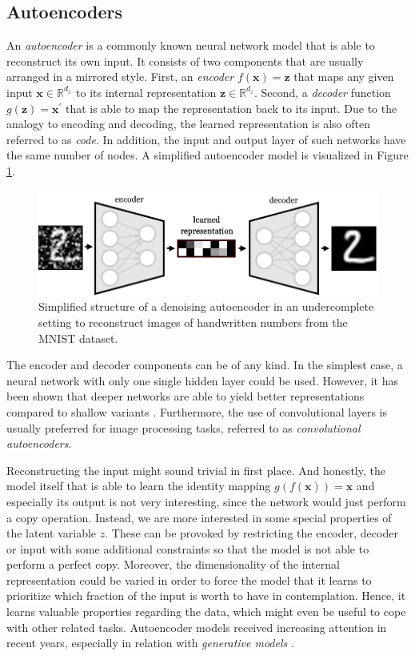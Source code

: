 \subsection{Autoencoders} \label{sec:autoencoder}

An \textit{autoencoder} is a commonly known neural network model that is able to reconstruct its own input. It consists of two components that are usually arranged in a mirrored style. First, an \textit{encoder} $ f(\textbf{x}) = \textbf{z} $ that maps any given input $ \textbf{x} \in \mathbb{R}^{d_x} $ to its internal representation $ \textbf{z} \in \mathbb{R}^{d_z} $. Second, a \textit{decoder} function $ g(\textbf{z}) = \textbf{x}^\prime $ that is able to map the representation back to its input. Due to the analogy to encoding and decoding, the learned representation is also often referred to as \textit{code}. In addition, the input and output layer of such networks have the same number of nodes. A simplified autoencoder model is visualized in Figure \ref{fig:autoencoder}. 

\begin{figure}[htpb]
	\centering
	\includegraphics[width=.8\linewidth]{figures/encoder_decoder.pdf}
	\caption[Structure of an Autoencoder]{Simplified structure of a denoising autoencoder in an undercomplete setting to reconstruct images of handwritten numbers from the MNIST dataset.} \label{fig:autoencoder}
\end{figure}

The encoder and decoder components can be of any kind. In the simplest case, a neural network with only one single hidden layer could be used. However, it has been shown that deeper networks are able to yield better representations compared to shallow variants \parencite{autoenc_deeper}. Furthermore, the use of convolutional layers is usually preferred for image processing tasks, referred to as \textit{convolutional autoencoders}.

Reconstructing the input might sound trivial in first place. And honestly, the model itself that is able to learn the identity mapping $ g(f(\textbf{x})) = \textbf{x} $ and especially its output is not very interesting, since the network would just perform a copy operation. Instead, we are more interested in some special properties of the latent variable $ z $. These can be provoked by restricting the encoder, decoder or input with some additional constraints so that the model is not able to perform a perfect copy. Moreover, the dimensionality of the internal representation could be varied in order to force the model that it learns to prioritize which fraction of the input is worth to have in contemplation. Hence, it learns valuable properties regarding the data, which might even be useful to cope with other related tasks. Autoencoder models received increasing attention in recent years, especially in relation with \textit{generative models} \parencite[p. 502]{deep_learning}.

